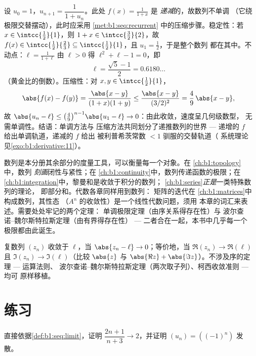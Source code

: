 \begin{example}\label{ex:b1:seq:golden}
设 $u_0 = 1$，$u_{n+1} = \dfrac{1}{1 + u_n}$。此处 $f(x) =
\frac{1}{1+x}$ 是 \emph{递减}的，故数列不单调
（它绕极限交替摆动），此时应采用
\cref{met:b1:seq:recurrent} 中的压缩步骤。稳定性：若
$x \in \intcc{\frac12}{1}$，则 $1 + x \in
\intcc{\frac32}{2}$，故 $f(x) \in \intcc{\frac12}{\frac23}
\subseteq \intcc{\frac12}{1}$，且 $u_1 = \frac12$，于是整个数列
都在其中。不动点：$\ell = \frac{1}{1+\ell}$
由 $\ell > 0$ 得 $\ell^2 + \ell - 1 = 0$，即
\[
\ell = \frac{\sqrt5 - 1}{2} = 0.6180\dots
\]
（黄金比的倒数）。压缩性：对 $x, y \in
\intcc{\frac12}{1}$，
\[
\abs{f(x) - f(y)} = \frac{\abs{x - y}}{(1+x)(1+y)}
\leq \frac{\abs{x-y}}{(3/2)^2} = \frac49\,\abs{x - y} ,
\]
故 $\abs{u_n - \ell} \leq \bigl(\frac49\bigr)^{n-1}\abs{u_1 -
\ell} \to 0$：由此收敛，速度呈几何级数型，
无需单调性。结语：单调方法与
压缩方法共同划分了递推数列的世界 ---
递增的 $f$ 给出单调轨道，递减的 $f$ 给出
被利普希茨常数 $< 1$ 驯服的交替轨道（
系统理论见\cref{exo:b1:derivative:11}）。
\end{example}

\begin{remark}[本分册中的展望]
数列是本分册其余部分的度量工具，可以衡量每一个对象。在
\cref{ch:b1:topology}中，数列
\emph{刻画}闭性与紧性；在
\cref{ch:b1:continuity}中，数列传递函数的极限；在
\cref{ch:b1:integration}中，黎曼和是收敛于积分的数列；
\cref{ch:b1:series}\emph{正是}一类特殊数列的理论，
即部分和。代数各章同样用到数列：
矩阵的迭代在
\cref{ch:b1:matrices}中构成数列，其性态
（$A^n$ 的收敛性）是一个线性代数问题，须用
本章的词汇来表述。需要处处牢记的两个定理：
单调极限定理（由序关系得存在性）与
波尔查诺--魏尔斯特拉斯定理（由有界得存在性） --- 二者合在一起，本书中几乎每一个
极限都由此诞生。
\end{remark}

\begin{remark}[复数列]
复数列 $(z_n)$ 收敛于 $\ell$，当
$\abs{z_n - \ell} \to 0$；等价地，当 $\Re(z_n) \to \Re(\ell)$
且 $\Im(z_n) \to \Im(\ell)$（比较 $\abs{z}$ 与 $\abs{\Re z} +
\abs{\Im z}$）。不涉及序的定理 --- 运算法则、
波尔查诺--魏尔斯特拉斯定理（两次取子列）、柯西收敛准则 --- 均可
原样移植。
\end{remark}

\section{练习}

\begin{exercise}[$\star$]\label{exo:b1:seq:1}
直接依据\cref{def:b1:seq:limit}，证明
$\dfrac{2n+1}{n+3} \to 2$，并证明 $(u_n) = ((-1)^n)$ 发散。
\end{exercise}

